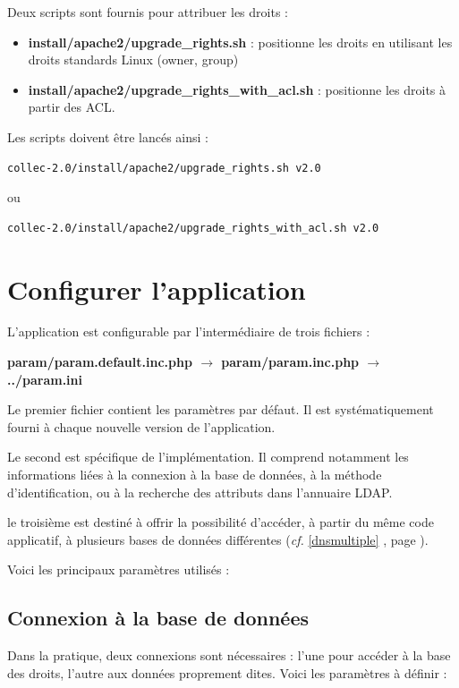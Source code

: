 Deux scripts sont fournis pour attribuer les droits : 
\begin{itemize}
\item \textbf{install/apache2/upgrade\_rights.sh} : positionne les droits en utilisant les droits standards Linux (owner, group)
\item \textbf{install/apache2/upgrade\_rights\_with\_acl.sh} : positionne les droits à partir des ACL.
\end{itemize}

Les scripts doivent être lancés ainsi :
\begin{lstlisting}
collec-2.0/install/apache2/upgrade_rights.sh v2.0
\end{lstlisting}
ou 
\begin{lstlisting}
collec-2.0/install/apache2/upgrade_rights_with_acl.sh v2.0
\end{lstlisting}


\section{Configurer l'application}

L'application est configurable par l'intermédiaire de trois fichiers :

\textbf{param/param.default.inc.php $\rightarrow$ param/param.inc.php $\rightarrow$ ../param.ini}

Le premier fichier contient les paramètres par défaut. Il est systématiquement fourni à chaque nouvelle version de l'application.

Le second est spécifique de l'implémentation. Il comprend notamment les informations liées à la connexion à la base de données, à la méthode d'identification, ou à la recherche des attributs dans l'annuaire LDAP. 

le troisième est destiné à offrir la possibilité d'accéder, à partir du même code applicatif, à plusieurs bases de données différentes (\textit{cf.} \ref{dnsmultiple} \textit{}, page \pageref{dnsmultiple}).

Voici les principaux paramètres utilisés :

\subsection{Connexion à la base de données}

Dans la pratique, deux connexions sont nécessaires : l'une pour accéder à la base des droits, l'autre aux données proprement dites. Voici les paramètres à définir :

